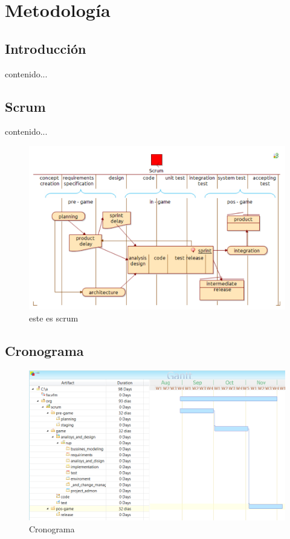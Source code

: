 \chapter{Metodología}
\section{Introducción}
contenido...
\newpage
\section{Scrum}
contenido...
\begin{figure}[th!]
	\centering
	\includegraphics[width=0.9\linewidth]{proyecto/imgs/scrum}
	\caption[scrum]{este es scrum}
\end{figure}
\newpage
\section{Cronograma}
\begin{figure}[th!]
	\centering
	\includegraphics[width=0.9\linewidth]{proyecto/imgs/cronograma.png}
	\caption{Cronograma}
\end{figure}
